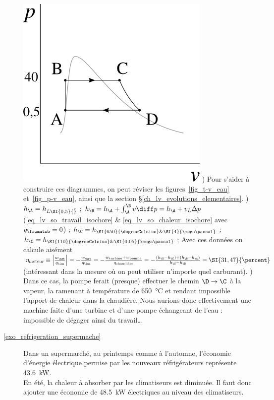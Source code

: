 \begin{description}
			\includegraphics[height=\solutiondiagramwidth]{images/exo_sol_pv_moteur_vapeur.png}
			) Pour s’aider à construire ces diagrammes, on peut réviser les figures~\ref{fig_t-v_eau} et~\ref{fig_p-v_eau}, ainsi que la section \S\ref{ch_lv_evolutions_elementaires}.
			)	$h_\A = h_{L \SI{0,5}{\bar}}$ ; 
						$h_\B = h_\A + \int_\A^\B v \diff p = h_\A + v_L \Delta p $ (\ref{eq_lv_so_travail_isochore} \& \ref{eq_lv_so_chaleur_isochore} avec $q_\fromatob = 0$) ;
						$h_\C = h_{\SI{650}{\degreeCelsius} \& \SI{4}{\mega\pascal}}$ ;
						$h_\C = h_{\SI{110}{\degreeCelsius} \& \SI{0,05}{\mega\pascal}}$ ;
						Avec ces données on calcule aisément $\eta_\text{moteur} \equiv \left|\frac{w_\net}{q_\inn}\right| = -\frac{w_\net}{q_\inn} = -\frac{w_\text{turbine} + w_\text{pompe}}{q_\text{chaudière}} = -\frac{(h_\D - h_\C) + (h_\B - h_\A)}{h_\C - h_\B} = \SI{31,47}{\percent}$ (intéressant dans la mesure où on peut utiliser n’importe quel carburant).
			\tab{}) Dans ce cas, la pompe ferait (presque) effectuer le chemin $\D \to \C$ à la vapeur, la ramenant à température de \SI{650}{\degreeCelsius} et rendant impossible l’apport de chaleur dans la chaudière. Nous aurions donc effectivement une machine faite d’une turbine et d’une pompe échangeant de l’eau : impossible de dégager ainsi du travail…
	\item [\ref{exo_refrigeration_supermache}] 
			\tab Dans un supermarché, au printemps comme à l’automne, l’économie d’énergie électrique permise par les nouveaux réfrigérateurs représente \SI{43,6}{\kilo\watt}.\\
			En été, la chaleur à absorber par les climatiseurs est diminuée. Il faut donc ajouter une économie de \SI{48,5}{\kilo\watt} électriques au niveau des climatiseurs.\\

\end{description}
